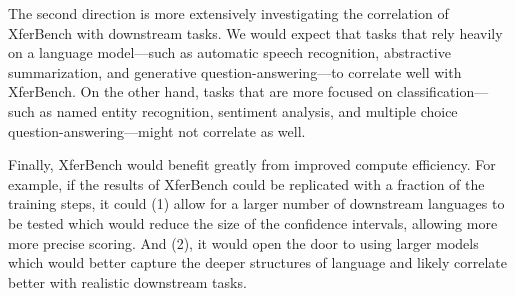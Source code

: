 The second direction is more extensively investigating the correlation of XferBench with downstream tasks.
We would expect that tasks that rely heavily on a language model---such as automatic speech recognition, abstractive summarization, and generative question-answering---to correlate well with XferBench.
On the other hand, tasks that are more focused on classification---such as named entity recognition, sentiment analysis, and multiple choice question-answering---might not correlate as well.

Finally, XferBench would benefit greatly from improved compute efficiency.
For example, if the results of XferBench could be replicated with a fraction of the training steps, it could (1) allow for a larger number of downstream languages to be tested which would reduce the size of the confidence intervals, allowing more more precise scoring.
And (2), it would open the door to using larger models which would better capture the deeper structures of language and likely correlate better with realistic downstream tasks.
